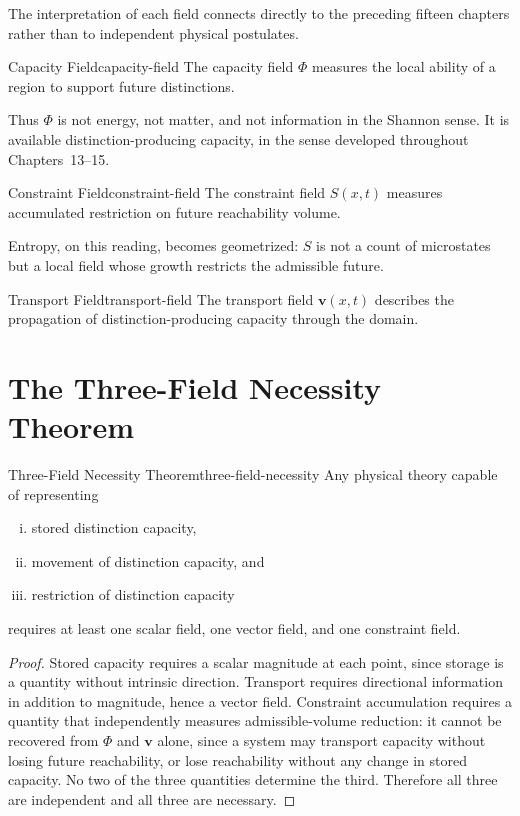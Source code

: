 \documentclass[12pt,twoside,openright]{book}
\begin{document}
The interpretation of each field connects directly to the
preceding fifteen chapters rather than to independent
physical postulates.

\begin{definition}{Capacity Field}{capacity-field}
  The capacity field $\Phi$ measures the local ability of
  a region to support future distinctions.
\end{definition}

Thus $\Phi$ is not energy, not matter, and not information
in the Shannon sense. It is available
distinction-producing capacity, in the sense developed
throughout Chapters~13--15.

\begin{definition}{Constraint Field}{constraint-field}
  The constraint field $S(x,t)$ measures accumulated
  restriction on future reachability volume.
\end{definition}

Entropy, on this reading, becomes geometrized: $S$ is not
a count of microstates but a local field whose growth
restricts the admissible future.

\begin{definition}{Transport Field}{transport-field}
  The transport field $\mathbf{v}(x,t)$ describes the
  propagation of distinction-producing capacity through
  the domain.
\end{definition}

\section{The Three-Field Necessity Theorem}
\label{sec:ch16-necessity}

\begin{theorem}{Three-Field Necessity Theorem}{three-field-necessity}
  Any physical theory capable of representing
  \begin{enumerate}[(i)]
    \item stored distinction capacity,
    \item movement of distinction capacity, and
    \item restriction of distinction capacity
  \end{enumerate}
  requires at least one scalar field, one vector field,
  and one constraint field.
\end{theorem}

\begin{proof}
  Stored capacity requires a scalar magnitude at each
  point, since storage is a quantity without intrinsic
  direction. Transport requires directional information
  in addition to magnitude, hence a vector field. Constraint
  accumulation requires a quantity that independently
  measures admissible-volume reduction: it cannot be
  recovered from $\Phi$ and $\mathbf{v}$ alone, since a
  system may transport capacity without losing future
  reachability, or lose reachability without any change in
  stored capacity. No two of the three quantities determine
  the third. Therefore all three are independent and all
  three are necessary.
\end{proof}
\end{document}
